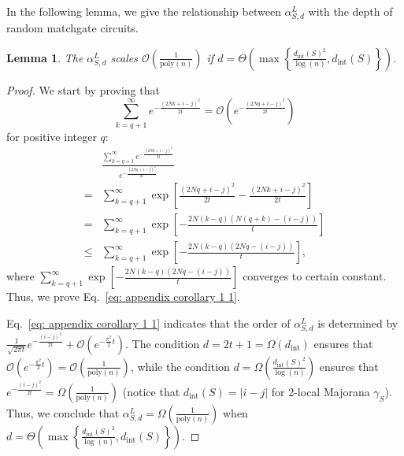 \documentclass[journal=jctcce,a4paper,manuscript=article]{achemso}
\newtheorem{lemma}{Lemma}
\begin{document}
In the following lemma, we give the relationship between $\alpha_{S,d}^L$ with the
depth of random matchgate circuits.
\begin{lemma}
  \label{corollary: 1}
  The $\alpha_{S,d}^L$ scales $\mathcal{O}\left( \frac{1}{\mathrm{poly}(n)}\right)$ if $d = \Theta\left(\max\left\{ \frac{d_{\text{int}}(S)^2}{\log(n)} , d_{\text{int}}(S)\right\}\right)$.
\end{lemma}
\begin{proof}
  We start by proving that
  \begin{equation}
    \label{eq: appendix corollary 1 1}
    \sum_{k=q+1}^{\infty} e^{-\frac{(2Nk+i-j)^2}{2t}}  = \mathcal{O}\left(e^{-\frac{(2Nq+i-j)^2}{2t}}\right)
  \end{equation}
  for positive integer $q$:
  \begin{align}
         & \frac{\sum_{k=q+1}^{\infty} e^{-\frac{(2Nk+i-j)^2}{2t}}}{e^{-\frac{(2Nq+i-j)^2}{2t}}} \\
    =    & \sum_{k=q+1}^{\infty} \exp\left[\frac{(2Nq+i-j)^2}{2t}-\frac{(2Nk+i-j)^2}{2t} \right] \\
    =    & \sum_{k=q+1}^{\infty} \exp\left[-\frac{2N(k-q)(N(q+k) -(i-j))}{t}\right]              \\
    \leq & \sum_{k=q+1}^{\infty} \exp\left[-\frac{2N(k-q)(2Nq -(i-j))}{t}\right],
  \end{align}
  where $\sum_{k=q+1}^{\infty} \exp\left[-\frac{2N(k-q)(2Nq -(i-j))}{t}\right]$ converges to certain constant. Thus, we prove Eq.~\eqref{eq: appendix corollary 1 1}.

  Eq.~\eqref{eq: appendix corollary 1 1} indicates that the order of
  $\alpha_{S,d}^L$ is determined by $\frac{1}{\sqrt{2\pi t}}
    e^{-\frac{(i-j)^2}{2t}}+\mathcal{O}\left(e^{-\frac{\pi^2}{2}t}\right).$ The
  condition $d = 2t+1 = \Omega(d_{\text{int}})$ ensures that
  $\mathcal{O}\left(e^{-\frac{\pi^2}{2}t}\right)
    =\mathcal{O}\left(\frac{1}{\mathrm{poly}(n)}\right) $, while the condition $d =
    \Omega(\frac{d_{\text{int}}(S)^2}{\log(n)} )$ ensures that
  $e^{-\frac{(i-j)^2}{2t}} =\Omega\left(\frac{1}{\mathrm{poly}(n)}\right) $
  (notice that $d_\text{int}(S) = |i-j|$ for 2-local Majorana $\gamma_S$). Thus,
  we conclude that $\alpha_{S,d}^L = \Omega\left(
    \frac{1}{\mathrm{poly}(n)}\right)$ when $d = \Theta\left(\max\left\{
    \frac{d_{\text{int}}(S)^2}{\log(n)} , d_{\text{int}}(S)\right\}\right)$.

\end{proof}
\end{document}
